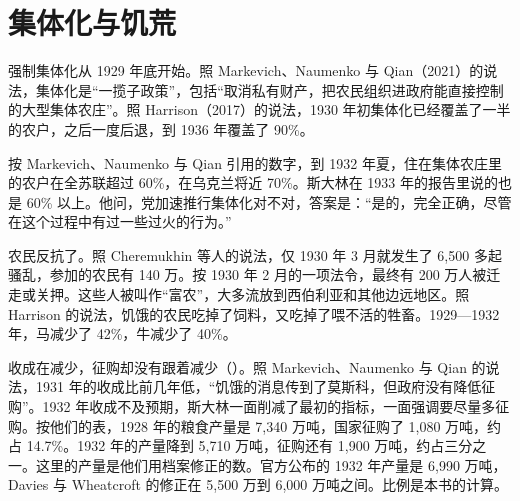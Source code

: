 \section{集体化与饥荒}\label{sec:soviet-famine}

强制集体化从 1929 年底开始\cite{mnq2021}。照 Markevich、Naumenko 与 Qian（2021）的说法，集体化是“一揽子政策”，包括“取消私有财产，把农民组织进政府能直接控制的大型集体农庄”\cite{mnq2021}。照 Harrison（2017）的说法，1930 年初集体化已经覆盖了一半的农户，之后一度后退，到 1936 年覆盖了 90\%\cite{harrison2017}。

按 Markevich、Naumenko 与 Qian 引用的数字，到 1932 年夏，住在集体农庄里的农户在全苏联超过 60\%，在乌克兰将近 70\%\cite{mnq2021}。斯大林在 1933 年的报告里说的也是 60\% 以上\cite{stalin1933}。他问，党加速推行集体化对不对，答案是：“是的，完全正确，尽管在这个过程中有过一些过火的行为。”\cite{stalin1933}

农民反抗了。照 Cheremukhin 等人的说法，仅 1930 年 3 月就发生了 6,500 多起骚乱，参加的农民有 140 万\cite{cggt2013}。按 1930 年 2 月的一项法令，最终有 200 万人被迁走或关押\cite{harrison2017}。这些人被叫作“富农”，大多流放到西伯利亚和其他边远地区\cite{mnq2021}。照 Harrison 的说法，饥饿的农民吃掉了饲料，又吃掉了喂不活的牲畜\cite{harrison2017}。1929—1932 年，马减少了 42\%，牛减少了 40\%\cite{mnq2021}。


收成在减少，征购却没有跟着减少（）。照 Markevich、Naumenko 与 Qian 的说法，1931 年的收成比前几年低，“饥饿的消息传到了莫斯科，但政府没有降低征购”\cite{mnq2021}。1932 年收成不及预期，斯大林一面削减了最初的指标，一面强调要尽量多征购\cite{mnq2021}。按他们的表，1928 年的粮食产量是 7,340 万吨，国家征购了 1,080 万吨，约占 14.7\%\cite{mnq2021}。1932 年的产量降到 5,710 万吨，征购还有 1,900 万吨，约占三分之一\cite{mnq2021}。这里的产量是他们用档案修正的数。官方公布的 1932 年产量是 6,990 万吨，Davies 与 Wheatcroft 的修正在 5,500 万到 6,000 万吨之间\cite{mnq2021}。比例是本书的计算。

